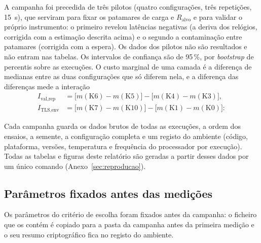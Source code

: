 A campanha foi precedida de três pilotos (quatro configurações, três repetições,
15~s), que serviram para fixar os patamares de carga e $R_{\text{alvo}}$ e para
validar o próprio instrumento: o primeiro revelou latências negativas (a deriva
dos relógios, corrigida com a estimação descrita acima) e o segundo a
contaminação entre patamares (corrigida com a espera). Os dados dos pilotos não são
resultados e não entram nas tabelas. Os intervalos
de confiança são de 95\,\%, por \emph{bootstrap} de percentis sobre as execuções.
O custo marginal de uma camada é a diferença de medianas entre as duas
configurações que só diferem nela, e a diferença das diferenças mede a interação
\begin{equation}
  \begin{aligned}
  I_{\text{val,rep}} &= \bigl[m(\mathrm{K6}) - m(\mathrm{K5})\bigr] - \bigl[m(\mathrm{K4}) - m(\mathrm{K3})\bigr],\\
  I_{\text{TLS,env}} &= \bigl[m(\mathrm{K7}) - m(\mathrm{K10})\bigr] - \bigl[m(\mathrm{K1}) - m(\mathrm{K0})\bigr]:
  \end{aligned}
  \label{eq:interacao}
\end{equation}

Cada campanha guarda os dados brutos de todas as execuções, a ordem dos ensaios, a
semente, a configuração completa e um registo do ambiente (código, plataforma,
versões, temperatura e frequência do processador por execução). Todas as tabelas e
figuras deste relatório são geradas a partir desses dados por um único comando
(Anexo~\ref{sec:reproducao}).

\subsection{Parâmetros fixados antes das medições}
\label{sec:parametros}

Os parâmetros do critério de escolha foram fixados antes da campanha: o ficheiro
que os contém é copiado para a pasta da campanha antes da primeira medição e o seu
resumo criptográfico fica no registo do ambiente.

